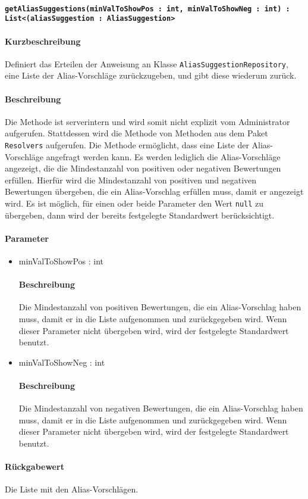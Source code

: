 \paragraph*{\texttt{getAliasSuggestions(minValToShowPos : int, minValToShowNeg : int) : List<(aliasSuggestion : AliasSuggestion>}}%
\paragraph*{Kurzbeschreibung}
Definiert das Erteilen der Anweisung an Klasse \texttt{AliasSuggestionRepository}, eine Liste der Alias-Vorschläge zurückzugeben, und gibt diese wiederum zurück.
\paragraph*{Beschreibung}
Die Methode ist serverintern und wird somit nicht explizit vom Administrator aufgerufen.
Stattdessen wird die Methode von Methoden aus dem Paket \texttt{Resolvers} aufgerufen.
Die Methode ermöglicht, dass eine Liste der Alias-Vorschläge angefragt werden kann.
Es werden lediglich die Alias-Vorschläge angezeigt, die die Mindestanzahl von positiven oder negativen Bewertungen erfüllen.
Hierfür wird die Mindestanzahl von positiven und negativen Bewertungen übergeben, die ein Alias-Vorschlag erfüllen muss, damit er angezeigt wird.
Es ist möglich, für einen oder beide Parameter den Wert \texttt{null} zu übergeben, dann wird der bereits festgelegte Standardwert berücksichtigt.
\paragraph*{Parameter}
\begin{itemize}
	\item minValToShowPos : int
		\paragraph*{Beschreibung}
		Die Mindestanzahl von positiven Bewertungen, die ein Alias-Vorschlag haben muss, damit er in die Liste aufgenommen und zurückgegeben wird.
		Wenn dieser Parameter nicht übergeben wird, wird der festgelegte Standardwert benutzt.
	\item minValToShowNeg : int
		\paragraph*{Beschreibung}
		Die Mindestanzahl von negativen Bewertungen, die ein Alias-Vorschlag haben muss, damit er in die Liste aufgenommen und zurückgegeben wird. 
		Wenn dieser Parameter nicht übergeben wird, wird der festgelegte Standardwert benutzt.
\end{itemize}
\paragraph*{Rückgabewert}
Die Liste mit den Alias-Vorschlägen. 
